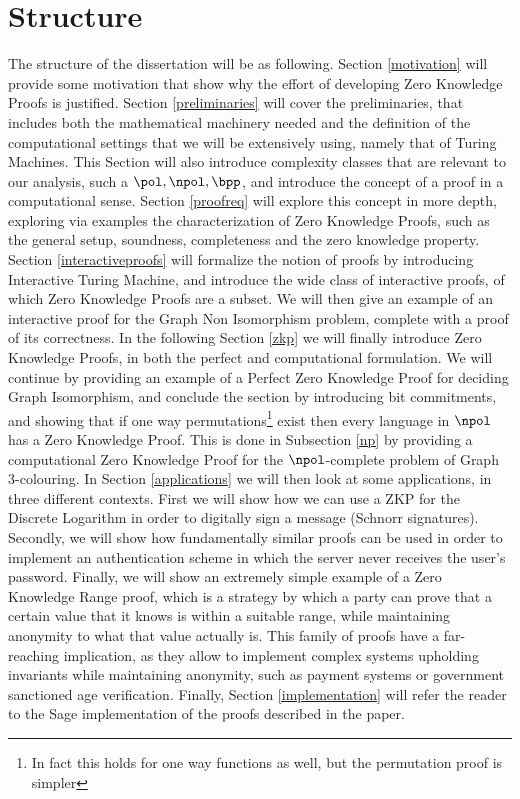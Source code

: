 \documentclass{article}
\begin{document}
\section{Structure}
The structure of the dissertation will be as following. Section \ref{motivation} will provide some motivation that show why
the effort of developing Zero Knowledge Proofs is justified. Section \ref{preliminaries} will cover the preliminaries,
that includes both the mathematical machinery needed and the definition of the computational settings that we will
be extensively using, namely that of Turing Machines. This Section will also introduce complexity classes that are
relevant to our analysis, such a $\pol, \npol, \bpp$, and introduce the concept of a proof in a computational sense.
Section \ref{proofreq} will explore this concept in more depth, exploring via examples the characterization of
Zero Knowledge Proofs, such as the general setup, soundness, completeness and the zero knowledge property.
Section \ref{interactiveproofs} will formalize the notion of proofs by introducing Interactive Turing Machine, and
introduce the wide class of interactive proofs, of which Zero Knowledge Proofs are a subset. We will then give an
example of an interactive proof for the Graph Non Isomorphism problem, complete with a proof of its correctness.
In the following Section \ref{zkp} we will finally introduce Zero Knowledge Proofs, in both the perfect and computational
formulation. We will continue by providing an example of a Perfect Zero Knowledge Proof for deciding Graph Isomorphism,
and conclude the section by introducing bit commitments, and showing that if one way permutations\footnote{In fact this holds for one way functions as well, but the permutation proof is simpler} exist
then every language in $\npol$ has a Zero Knowledge Proof. This is done in Subsection \ref{np} by providing a
computational Zero Knowledge Proof for the $\npol$-complete problem of Graph 3-colouring.
In Section \ref{applications} we will then look at some applications, in three different contexts. First we will
show how we can use a ZKP for the Discrete Logarithm in order to digitally sign a message (Schnorr signatures). Secondly,
we will show how fundamentally similar proofs can be used in order to implement an authentication scheme in which the
server never receives the user's password. Finally, we will show an extremely simple example of a Zero Knowledge Range
proof, which is a strategy by which a party can prove that a certain value that it knows is within a suitable range, while
maintaining anonymity to what that value actually is. This family of proofs have a far-reaching implication, as they allow
to implement complex systems upholding invariants while maintaining anonymity, such as payment systems or government sanctioned
age verification. Finally, Section \ref{implementation} will refer the reader to the Sage implementation of the proofs described
in the paper.
\end{document}
